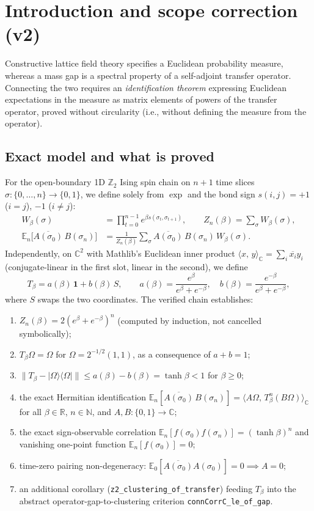 \documentclass[11pt]{article}
\theoremstyle{remark}
\theoremstyle{definition}
\newcommand{\lean}[1]{\texttt{#1}}
\newcommand{\R}{\mathbb{R}}
\newcommand{\C}{\mathbb{C}}
\newcommand{\Z}{\mathbb{Z}}
\newcommand{\Om}{\Omega}
\newcommand{\inn}[2]{\langle #1,\, #2\rangle_{\C}}
\newcommand{\Ex}{\mathbb{E}}
\newcommand{\ket}[1]{|#1\rangle}
\newcommand{\bra}[1]{\langle #1|}
\begin{document}
\section{Introduction and scope correction (v2)}

Constructive lattice field theory specifies a Euclidean probability measure, whereas a
mass gap is a spectral property of a self-adjoint transfer operator. Connecting the two
requires an \emph{identification theorem} expressing Euclidean expectations in the measure
as matrix elements of powers of the transfer operator, proved without circularity (i.e.,
without defining the measure from the operator).

\subsection{Exact model and what is proved}

For the open-boundary 1D $\Z_2$ Ising spin chain on $n+1$ time slices
$\sigma : \{0,\dots,n\} \to \{0,1\}$, we define solely from $\exp$ and the bond sign
$s(i,j) = +1$ ($i=j$), $-1$ ($i \neq j$):
\begin{align*}
  W_\beta(\sigma) &= \prod_{t=0}^{n-1} e^{\beta s(\sigma_t,\sigma_{t+1})},
  \qquad
  Z_n(\beta) = \sum_{\sigma} W_\beta(\sigma), \\
  \Ex_n\bigl[\overline{A(\sigma_0)}\,B(\sigma_n)\bigr]
  &= \frac{1}{Z_n(\beta)}\sum_{\sigma}\overline{A(\sigma_0)}\,B(\sigma_n)\,W_\beta(\sigma).
\end{align*}
Independently, on $\C^2$ with Mathlib's Euclidean inner product $\inn{x}{y} = \sum_i \overline{x_i} y_i$
(conjugate-linear in the first slot, linear in the second), we define
\[
  T_\beta = a(\beta)\,\mathbf{1} + b(\beta)\,S,
  \qquad
  a(\beta) = \frac{e^{\beta}}{e^{\beta}+e^{-\beta}},\quad
  b(\beta) = \frac{e^{-\beta}}{e^{\beta}+e^{-\beta}},
\]
where $S$ swaps the two coordinates. The verified chain establishes:
\begin{enumerate}
  \item $Z_n(\beta) = 2(e^\beta + e^{-\beta})^n$ (computed by induction, not cancelled symbolically);
  \item $T_\beta\Om = \Om$ for $\Om = 2^{-1/2}(1,1)$, as a consequence of $a+b=1$;
  \item $\|T_\beta - \ket{\Om}\bra{\Om}\| \le a(\beta)-b(\beta) = \tanh\beta < 1$ for $\beta \ge 0$;
  \item the exact Hermitian identification
        $\Ex_n[\overline{A(\sigma_0)}\,B(\sigma_n)] = \inn{A\Om}{T_\beta^n (B\Om)}$ for all
        $\beta \in \R$, $n \in \mathbb{N}$, and $A,B : \{0,1\} \to \C$;
  \item the exact sign-observable correlation $\Ex_n[f(\sigma_0)f(\sigma_n)] = (\tanh\beta)^n$
        and vanishing one-point function $\Ex_n[f(\sigma_0)] = 0$;
  \item time-zero pairing non-degeneracy: $\Ex_0[\overline{A(\sigma_0)}A(\sigma_0)] = 0 \implies A = 0$;
  \item an additional corollary (\lean{z2\_clustering\_of\_transfer}) feeding $T_\beta$ into
        the abstract operator-gap-to-clustering criterion \lean{connCorrC\_le\_of\_gap}.
\end{enumerate}
\end{document}
